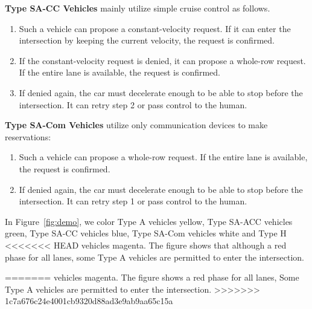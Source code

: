 \noindent
\textbf{Type SA-CC Vehicles} mainly utilize simple cruise control as follows.
\begin{enumerate}

\item Such a vehicle can propose a constant-velocity request. If it
can enter the intersection by keeping the current velocity, the
request is confirmed.

\item If the constant-velocity request is denied, it can propose a whole-row
  request. If the entire lane is available, the request is confirmed.

\item If denied again, the car must decelerate enough to be able to
stop before the intersection.  It can retry step 2 or pass control to
the human.

\end{enumerate}

\noindent
\textbf{Type SA-Com Vehicles} utilize only communication devices
to make reservations:
\begin{enumerate}

\item Such a vehicle can propose a whole-row request.  If the entire
lane is available, the request is confirmed.

\item If denied again, the car must decelerate enough to be able to
stop before the intersection.  It can retry step 1 or pass control to
the human.

\end{enumerate}

In Figure~\ref{fig:demo}, we color Type A vehicles yellow, Type SA-ACC vehicles
green, Type SA-CC vehicles blue, Type SA-Com vehicles white and Type H
<<<<<<< HEAD
vehicles magenta. The figure shows that although a red phase for all lanes,
some Type A vehicles are permitted to enter the intersection.


=======
vehicles magenta. The figure shows a red phase for all lanes, Some Type A vehicles
are permitted to enter the intersection.
>>>>>>> 1c7a676c24e4001cb9320d88ad3e9ab9aa65c15a









